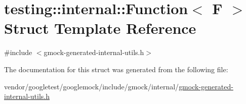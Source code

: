 \hypertarget{structtesting_1_1internal_1_1Function}{}\section{testing\+:\+:internal\+:\+:Function$<$ F $>$ Struct Template Reference}
\label{structtesting_1_1internal_1_1Function}


{\ttfamily \#include $<$gmock-\/generated-\/internal-\/utils.\+h$>$}



The documentation for this struct was generated from the following file\+:\begin{DoxyCompactItemize}
\item 
vendor/googletest/googlemock/include/gmock/internal/\hyperlink{gmock-generated-internal-utils_8h}{gmock-\/generated-\/internal-\/utils.\+h}\end{DoxyCompactItemize}
